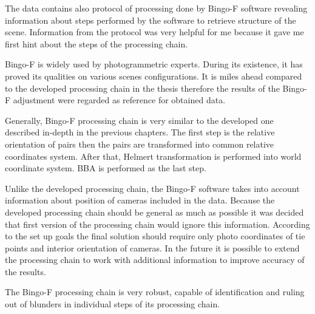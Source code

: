 \documentclass[a4paper,12pt]{article}
\begin{document}

The data contains also protocol of processing done by Bingo-F software \cite{bingo2013gip} revealing 
information about steps performed by the software to retrieve structure of the scene.
Information from the protocol was very helpful for me because 
it gave me first hint about the steps of the processing chain.

Bingo-F is widely used by photogrammetric experts. During its existence, it has proved its qualities on various scenes configurations.  
It is miles ahead compared to the developed processing chain in the thesis therefore the results of the Bingo-F adjustment were 
regarded as reference for obtained data.

Generally, Bingo-F processing chain is very similar to the developed  one  
described in-depth in the previous chapters. The first step is the relative orientation of pairs then the pairs are transformed into common relative 
coordinates system. After that, Helmert transformation is performed into world coordinate system. BBA is performed as the last step.

Unlike the developed processing chain, the Bingo-F software takes into account information about position of cameras included in the data. 
Because the developed processing chain should be general as much as possible it was decided that first version of the processing chain would ignore this 
information. According to the set up goals the final solution should require only photo coordinates of tie points and interior 
orientation of cameras. In the future it is possible to extend the processing chain to work with additional information to improve accuracy 
of the results. 

The Bingo-F processing chain is very robust,
capable of identification and ruling out of blunders in individual steps of its processing chain.
\end{document}
